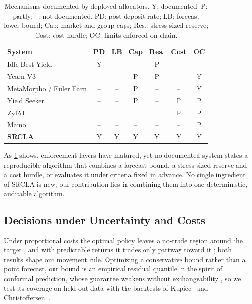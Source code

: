 \documentclass[sigconf]{acmart}
\begin{document}
\begin{table}[t]
\caption{Mechanisms documented by deployed allocators. Y: documented; P: partly; --: not documented. PD: post-deposit rate; LB: forecast lower bound; Cap: market and group caps; Res.: stress-sized reserve; Cost: cost hurdle; OC: limits enforced on chain.}
\label{tab:systems}
\centering
\small
\setlength{\tabcolsep}{5pt}
\begin{tabular}{lcccccc}
\toprule
System & PD & LB & Cap & Res. & Cost & OC \\
\midrule
Idle Best Yield         & Y  & -- & -- & P  & -- & -- \\
Yearn V3                & -- & -- & P  & P  & -- & Y  \\
MetaMorpho / Euler Earn & -- & -- & P  & -- & -- & Y  \\
Yield Seeker            & -- & -- & P  & -- & P  & P  \\
ZyfAI                   & -- & -- & -- & -- & P  & P  \\
Mamo                    & -- & -- & -- & -- & -- & P  \\
\midrule
\textbf{SRCLA}          & Y  & Y  & Y  & Y  & Y  & Y  \\
\bottomrule
\end{tabular}
\end{table}

As \cref{tab:systems} shows, enforcement layers have matured, yet no documented system states a reproducible algorithm that combines a forecast bound, a stress-sized reserve and a cost hurdle, or evaluates it under criteria fixed in advance. No single ingredient of SRCLA is new; our contribution lies in combining them into one deterministic, auditable algorithm.

\subsection{Decisions under Uncertainty and Costs}

Under proportional costs the optimal policy leaves a no-trade region around the target \citep{constantinides1986}, and with predictable returns it trades only partway toward it \citep{garleanu2013}; both results shape our movement rule. Optimizing a conservative bound rather than a point forecast, our bound is an empirical residual quantile in the spirit of conformal prediction, whose guarantee weakens without exchangeability \citep{barber2023conformal}, so we test its coverage on held-out data with the backtests of Kupiec~\citep{kupiec1995} and Christoffersen~\citep{christoffersen1998}.
\end{document}
